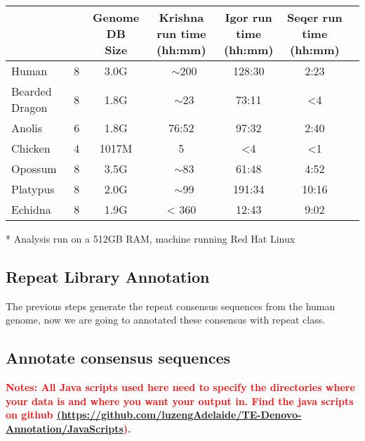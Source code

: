 \documentclass[12pt]{report}
\begin{document}
\footnotesize  %
\setlength\tabcolsep{1.5pt}
\begin{center}
	\begin{tabular}{|l|c|c|c|c|c|c|}
		\hline
		\thead{Genome}	&	\thead{ Krishna Threads }	&	\thead{Genome DB \\ Size}	& \thead{Krishna run time \\ (hh:mm)}	&	\thead{Igor run time \\ (hh:mm)}	&	\thead{Seqer run time \\ (hh:mm)}  \\
		\hline
		Human	&	8	&	3.0G	&	~$\sim$200	&	128:30	&	2:23 \\
		\hline 
		Bearded Dragon	&	8	&	1.8G	&	~$\sim$23	&	73:11	&	{<}4 \\
		\hline
		Anolis	& 6	& 1.8G	& 76:52	&	97:32	& 2:40	\\
		\hline
		Chicken	&	4	&	1017M	&	5	&	{<}4 & {<}1 \\
		\hline
		Opossum	&	8	&	3.5G	&	~$\sim$83	&	61:48	&	4:52 \\
		\hline
		Platypus	&	8	&	2.0G	&	~$\sim$99	&	191:34	&	10:16 \\
		\hline
		Echidna	&	8	&	1.9G	&	{<} 360	&	12:43	&	9:02 \\
		\hline
	\end{tabular}
\end{center}

* Analysis run on a 512GB RAM, machine running Red Hat Linux




\subsection*{Repeat Library Annotation}
The previous steps generate the repeat consensus sequences from the human genome, now we are going to annotated these consensus with repeat class.
\subsection*{Annotate consensus sequences}
\textbf{\textcolor{red}{Notes: All Java scripts used here need to specify the directories where your data is and where you want your output in. Find the java scripts on github \href{<url>}(\url{https://github.com/luzengAdelaide/TE-Denovo-Annotation/JavaScripts}). }}
\end{document}
